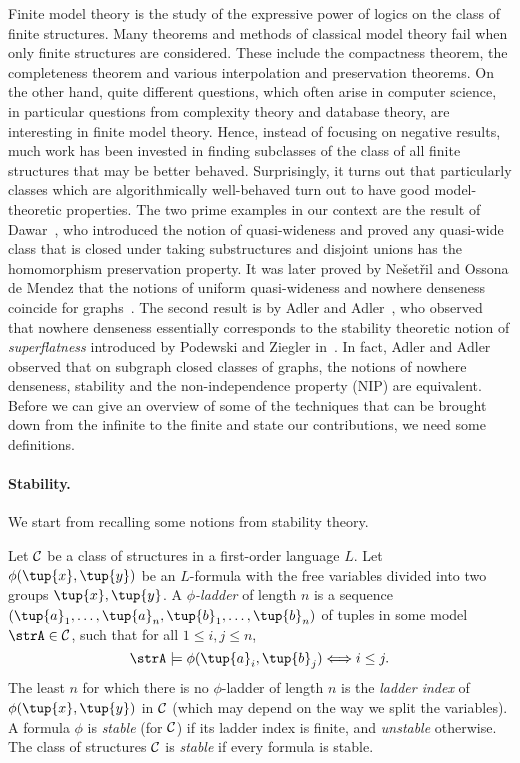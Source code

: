 Finite model theory is the study of the expressive power 
of logics on the class of finite structures. Many theorems and 
methods of classical model theory fail when only finite structures 
are considered. These include the compactness theorem, the completeness 
theorem and various interpolation and preservation theorems.
On the other hand, quite different questions, which often arise in
computer science, in particular questions from complexity theory and database
theory, are interesting in finite model theory. Hence, instead of focusing 
on negative results, much work has been invested in finding 
subclasses of the class of all finite structures that may be better behaved.
Surprisingly, it turns out that particularly classes which are 
algorithmically well-behaved turn out to have good model-theoretic 
properties. The two prime examples in our context are the result of 
Dawar~\cite{dawar2010homomorphism}, who introduced the notion of
quasi-wideness and proved any quasi-wide class that is closed under taking substructures
and disjoint unions has the homomorphism preservation property. It was 
later proved by Ne\v{s}et\v{r}il and Ossona de Mendez that 
the notions of uniform quasi-wideness and nowhere denseness coincide for 
graphs~\cite{nevsetvril2011nowhere}. The second result is by 
Adler and Adler~\cite{adler2014interpreting}, who observed that 
nowhere denseness essentially corresponds to the stability theoretic notion 
of \emph{superflatness} introduced by Podewski and 
Ziegler in~\cite{podewski1978stable}. In fact, Adler and Adler observed 
that on subgraph closed classes of graphs, the notions of nowhere denseness, 
stability and the non-independence property (NIP) are equivalent. 
Before we can give an 
overview of some of the techniques that can be brought down from 
the infinite to the finite and state our contributions, we need some
definitions. 

\paragraph{Stability.}
We start from recalling some notions from stability theory. 



\begin{definition}
Let $\cal C$ be a class of structures in a first-order language $L$. Let 
$\phi(\tup{x},\tup{y})$ be an $L$-formula with the free variables
divided into two groups $\tup{x}, \tup{y}$. A \emph{$\phi$-ladder}
of length $n$ is a sequence $(\tup{a}_1,\ldots, \tup{a}_{n},
\tup{b}_1,\ldots, \tup{b}_{n})$ of tuples in some model $\strA\in \cal C$, such that for all $1\leq i,j\le n$,
\[\strA\models\phi(\tup{a}_i,\tup{b}_j)\Longleftrightarrow i\leq j. \]
The least  $n$ for which 
there is no $\phi$-ladder of length $n$ is 
the \emph{ladder index} 
of $\phi(\tup{x},\tup{y})$ in $\cal C$ (which may depend on the way we split the
variables).
A formula $\phi$ is \emph{stable} (for $\cal C$) if its ladder index is finite, and \emph{unstable} otherwise. The class of structures $\cal C$ is \emph{stable} if  every formula is stable.
\end{definition}

